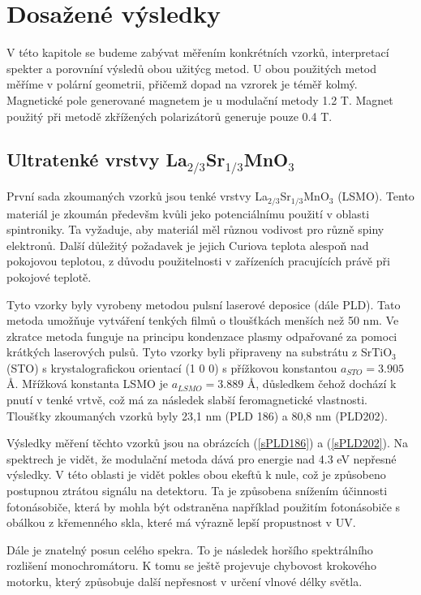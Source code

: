 \chapter{Dosažené výsledky}
V této kapitole se budeme zabývat měřením konkrétních vzorků, interpretací spekter a porovníní výsledů obou užitýcg metod. U obou použitých 
metod měříme v polární geometrii, přičemž dopad na vzrorek je téměř kolmý. Magnetické pole generované magnetem je u modulační metody 1.2 T. Magnet 
použitý při metodě zkřížených polarizátorů generuje pouze 0.4 T.

\section{Ultratenké vrstvy La$_{2/3}$Sr$_{1/3}$MnO$_3$}
První sada zkoumaných vzorků jsou tenké vrstvy La$_{2/3}$Sr$_{1/3}$MnO$_3$ (LSMO). Tento materiál je zkoumán předevšm kvůli jeko potenciálnímu použití v oblasti spintroniky. 
Ta vyžaduje, aby materiál měl různou vodivost pro různě spiny elektronů. Další důležitý požadavek je jejich Curiova teplota alespoň nad pokojovou teplotou, z důvodu 
použitelnosti v zařízeních pracujících právě při pokojové teplotě.

Tyto vzorky byly vyrobeny metodou pulsní laserové deposice (dále PLD). Tato metoda umožňuje vytváření tenkých filmů o tloušťkách menších než 50 nm. Ve zkratce metoda funguje na principu kondenzace plasmy odpařované za pomoci krátkých laserových pulsů. 
Tyto vzorky byli připraveny na substrátu z SrTiO$_3$ (STO) s krystalografickou orientací (1 0 0) 
s přížkovou konstantou $a_{STO}=3.905$ \AA. Mřížková konstanta LSMO je $a_{LSMO}=3.889$ \AA, důsledkem čehož dochází k pnutí v tenké vrtvě, což má za následek slabší feromagnetické vlastnosti. Tloušťky zkoumaných vzorků byly 23,1 nm (PLD 186) a 80,8 nm (PLD202). 

Výsledky měření těchto vzorků jsou na obrázcích (\ref{sPLD186}) a (\ref{sPLD202}).
Na spektrech je vidět, že modulační metoda 
dává pro energie nad 4.3 eV nepřesné výsledky. V této oblasti je vidět pokles obou ekeftů k nule, 
což je způsobeno postupnou ztrátou signálu na detektoru. Ta je způsobena 
snížením účinnosti fotonásobiče, která by mohla být odstraněna například použitím fotonásobiče s obálkou z křemenného skla, které má výrazně lepší propustnost v UV.

Dále je znatelný posun celého spekra. To je následek horšího spektrálního rozlišení monochromátoru. K tomu se ještě projevuje chybovost krokového motorku, který 
způsobuje další nepřesnost v určení vlnové délky světla.

